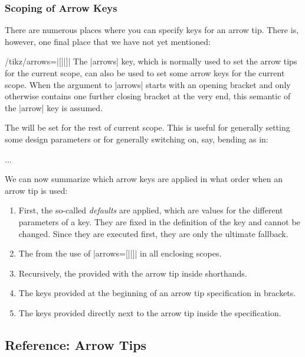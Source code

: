\subsubsection{Scoping of Arrow Keys}
\label{section-arrow-scopes}

There are numerous places where you can specify keys for an arrow tip. There
is, however, one final place that we have not yet mentioned:

\begin{key}{/tikz/arrows=|[||]|}
    The |arrows| key, which is normally used to set the arrow tips for the
    current scope, can also be used to set some arrow keys for the current
    scope. When the argument to |arrows| starts with an opening bracket and
    only otherwise contains one further closing bracket at the very end, this
    semantic of the |arrow| key is assumed.

    The  will be set for the rest of current scope. This is
    useful for generally setting some design parameters or for generally
    switching on, say, bending as in:
\begin{codeexample}
\tikz [arrows={[bend]}] ... %
\end{codeexample}
\end{key}

We can now summarize which arrow keys are applied in what order when an arrow
tip is used:
%
\begin{enumerate}
    \item First, the so-called \emph{defaults} are applied, which are values
        for the different parameters of a key. They are fixed in the
        definition of the key and cannot be changed. Since they are executed
        first, they are only the ultimate fallback.
    \item The  from the use of |arrows=[||]| in all
        enclosing scopes.
    \item Recursively, the  provided with the arrow tip inside
        shorthands.
    \item The keys provided at the beginning of an arrow tip specification in
        brackets.
    \item The keys provided directly next to the arrow tip inside the
        specification.
\end{enumerate}


\subsection{Reference: Arrow Tips}
\label{section-arrows-meta}

